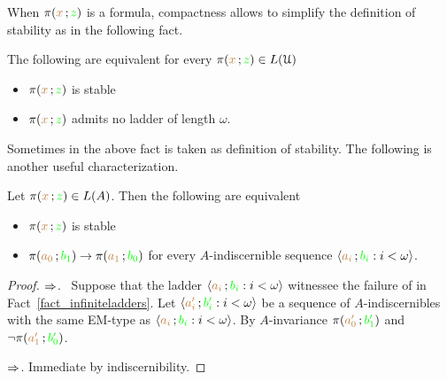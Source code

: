 When $\pi({\color{brown} x}\,;{\color{green} z})$ is a formula, compactness allows to simplify the definition of stability as in the following fact.

\begin{fact}\label{fact_infiniteladders}
  The following are equivalent for every $\pi({\color{brown} x}\,;{\color{green} z})\in L(\EuScript U)$
  \begin{itemize}
    \item [1.] $\pi({\color{brown} x}\,;{\color{green} z})$ is stable
    \item [2.] $\pi({\color{brown} x}\,;{\color{green} z})$ admits no ladder of length $\omega$.
  \end{itemize}
\end{fact}

Sometimes  in the above fact is taken as definition of stability.
The following is another useful characterization.

\begin{theorem}\label{thm_sability_indiscernibility}
  Let $\pi({\color{brown} x}\,;{\color{green} z})\in L(A)$.
  Then the following are equivalent
  \begin{itemize}
    \item[1.] $\pi({\color{brown} x}\,;{\color{green} z})$ is stable
    \item[2.] $\pi({\color{brown} a_0}\,;{\color{green} b_1})\rightarrow\pi({\color{brown} a_1}\,;{\color{green} b_0})$ for every $A$-indiscernible sequence $\langle{\color{brown}a_i}\,;{\color{green} b_i} : i<\omega\rangle$.
  \end{itemize}
\end{theorem}

\begin{proof}
  $\Rightarrow$. \ Suppose that the ladder $\langle{\color{brown}a_i}\,;{\color{green} b_i} : i<\omega\rangle$ witnessee the failure of  in Fact~\ref{fact_infiniteladders}.
  Let $\langle{\color{brown}a'_i}\,;{\color{green} b'_i} : i<\omega\rangle$ be a sequence of $A$-indiscernibles with the same EM-type as $\langle{\color{brown}a_i}\,;{\color{green} b_i} : i<\omega\rangle$.
  By $A$-invariance $\pi({\color{brown} a'_0}\,;{\color{green} b'_1})$ and $\neg\pi({\color{brown} a'_1}\,;{\color{green} b'_0})$.

  $\Rightarrow$. Immediate by indiscernibility.
\end{proof}


